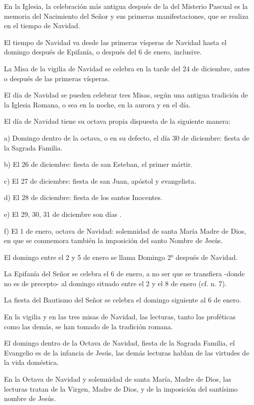 En la Iglesia, la celebración más antigua después de la del Misterio Pascual es la memoria del Nacimiento del Señor y sus primeras manifestaciones, que se realiza en el tiempo de Navidad.

El tiempo de Navidad va desde las primeras vísperas de Navidad hasta el domingo después de Epifanía, o después del 6 de enero, inclusive.

La Misa de la vigilia de Navidad se celebra en la tarde del 24 de diciembre, antes o después de las primeras vísperas.

El día de Navidad se pueden celebrar tres Misas, según una antigua tradición de la Iglesia Romana, o sea en la noche, en la aurora y en el día.

El día de Navidad tiene su octava propia dispuesta de la siguiente manera:

a) Domingo dentro de la octava, o en su defecto, el día 30 de diciembre: fiesta de la Sagrada Familia.

b) El 26 de diciembre: fiesta de san Esteban, el primer mártir.

c) El 27 de diciembre: fiesta de san Juan, apóstol y evangelista.

d) El 28 de diciembre: fiesta de los santos Inocentes.

e) El 29, 30, 31 de diciembre son días .

f) El 1 de enero, octava de Navidad: solemnidad de santa María Madre de Dios, en que se conmemora también la imposición del santo Nombre de Jesús.

El domingo entre el 2 y 5 de enero se llama Domingo 2° después de Navidad.

La Epifanía del Señor se celebra el 6 de enero, a no ser que se transfiera -donde no es de precepto- al domingo situado entre el 2 y el 8 de enero (cf. n. 7).

La fiesta del Bautismo del Señor se celebra el domingo siguiente al 6 de enero.

En la vigilia y en las tres misas de Navidad, las lecturas, tanto las proféticas como las demás, se han tomado de la tradición romana.

El domingo dentro de la Octava de Navidad, fiesta de la Sagrada Familia, el Evangelio es de la infancia de Jesús, las demás lecturas hablan de las virtudes de la vida doméstica.

En la Octava de Navidad y solemnidad de santa María, Madre de Dios, las lecturas tratan de la Virgen, Madre de Dios, y de la imposición del santísimo nombre de Jesús.

